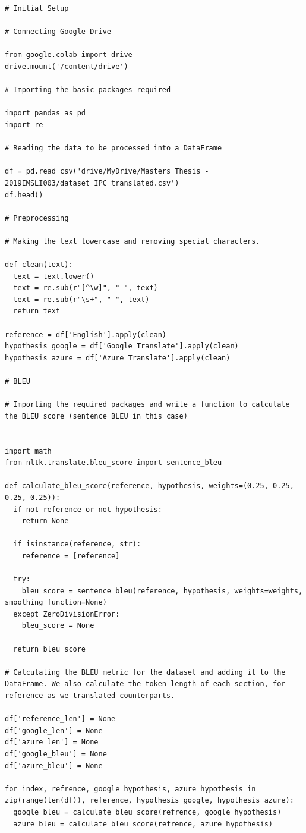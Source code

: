 \singlespacing
\begin{verbatim}
# Initial Setup

# Connecting Google Drive

from google.colab import drive
drive.mount('/content/drive')

# Importing the basic packages required

import pandas as pd
import re

# Reading the data to be processed into a DataFrame

df = pd.read_csv('drive/MyDrive/Masters Thesis - 2019IMSLI003/dataset_IPC_translated.csv')
df.head()

# Preprocessing

# Making the text lowercase and removing special characters.

def clean(text):
  text = text.lower()
  text = re.sub(r"[^\w]", " ", text)
  text = re.sub(r"\s+", " ", text)
  return text

reference = df['English'].apply(clean)
hypothesis_google = df['Google Translate'].apply(clean)
hypothesis_azure = df['Azure Translate'].apply(clean)

# BLEU

# Importing the required packages and write a function to calculate the BLEU score (sentence BLEU in this case)


import math
from nltk.translate.bleu_score import sentence_bleu

def calculate_bleu_score(reference, hypothesis, weights=(0.25, 0.25, 0.25, 0.25)):
  if not reference or not hypothesis:
    return None

  if isinstance(reference, str):
    reference = [reference]

  try:
    bleu_score = sentence_bleu(reference, hypothesis, weights=weights, smoothing_function=None)
  except ZeroDivisionError:
    bleu_score = None

  return bleu_score

# Calculating the BLEU metric for the dataset and adding it to the DataFrame. We also calculate the token length of each section, for reference as we translated counterparts.

df['reference_len'] = None
df['google_len'] = None
df['azure_len'] = None
df['google_bleu'] = None
df['azure_bleu'] = None

for index, refrence, google_hypothesis, azure_hypothesis in zip(range(len(df)), reference, hypothesis_google, hypothesis_azure):
  google_bleu = calculate_bleu_score(refrence, google_hypothesis)
  azure_bleu = calculate_bleu_score(refrence, azure_hypothesis)


\end{verbatim}
